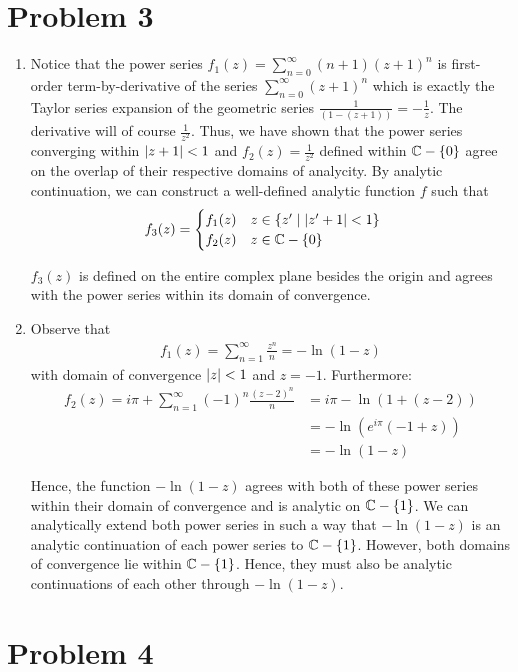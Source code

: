 \documentclass[12pt]{article}%
\newcommand{\infsum}[1][0]{\sum^{\infty}_{n = {#1}}}
\begin{document}
\section{Problem 3}
\begin{enumerate}
  \item Notice that the power series $f_1(z) = \infsum (n+1)(z+1)^{n}$ is first-order term-by-derivative of the series $\infsum (z+1)^n$ which is exactly the Taylor series expansion of the geometric series $\frac{1}{(1-(z+1))} = -\frac{1}{z}$. The derivative will of course $\frac{1}{z^2}$. Thus, we have shown that the power series converging within $\abs{z+1} < 1$ and $f_2(z) = \frac{1}{z^2}$ defined within ${\mathbb{C}} - \{0\}$ agree on the overlap of their respective domains of analycity. By analytic continuation, we can construct a well-defined analytic function $f$ such that
  \[ f_3(z) = \begin{cases}
    f_1(z) \quad z \in \{z' \mid \abs{z' + 1} < 1\} \\
    f_2(z) \quad z \in {\mathbb{C}} - \{0\}
  \end{cases} \]

  $f_3(z)$ is defined on the entire complex plane besides the origin and agrees with the power series within its domain of convergence.

  \item
  Observe that
  \begin{align*}
    f_1(z) = \infsum[1] \frac{z^n}{n} = - \ln(1 - z)
  \end{align*}
  with domain of convergence $\abs{z} < 1$ and $z = -1$. Furthermore:
  \begin{align*}
    f_2(z) = i\pi + \infsum[1] (-1)^n \frac{(z-2)^n}{n} & = i\pi -\ln(1+(z-2)) \\
    & = -\ln(e^{i\pi}(-1 +z)) \\
    & = -\ln(1 - z)
  \end{align*}

  Hence, the function $-\ln(1-z)$ agrees with both of these power series within their domain of convergence and is analytic on ${\mathbb{C}} - \{1\}$. We can analytically extend both power series in such a way that $-\ln(1-z)$ is an analytic continuation of each power series to ${\mathbb{C}} - \{1\}$. However, both domains of convergence lie within ${\mathbb{C}} - \{1\}$. Hence, they must also be analytic continuations of each other through  $-\ln(1-z)$.
\end{enumerate}

\section{Problem 4}
\end{document}

